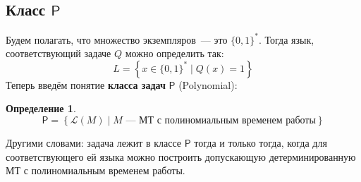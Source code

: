 \documentclass[a4paper,12pt]{article}
\newtheorem{definition}{Определение}
\newcommand{\Pclass}{\mathsf{P}}
\begin{document}
\subsection{Класс \(\Pclass\)}
Будем полагать, что множество экземпляров~--- это \(\{0, 1\}^*\). Тогда язык, соответствующий задаче \(Q\) можно определить так:
\[L = \left\{x \in \{0, 1\}^* \mid Q(x) = 1\right\}\]
Теперь введём понятие \textbf{класса задач} \(\Pclass\) (Polynomial):
\begin{definition}
    \[\Pclass = \left\{\mathscr{L}(M) \mid M\text{~--- МТ с полиномиальным временем работы}\right\}\]
\end{definition}
Другими словами: задача лежит в классе \(\Pclass\) тогда и только тогда, когда для соответствующего ей языка можно построить допускающую детерминированную МТ с полиномиальным временем работы.
    
\end{document}
